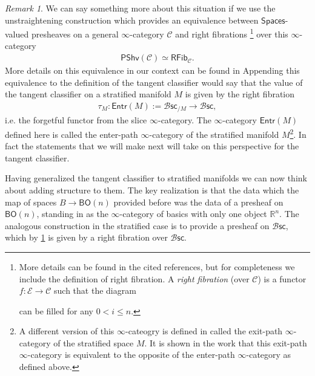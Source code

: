\documentclass[12pt,a4paper]{article}
\newcounter{counter} \numberwithin{counter}{section}
\theoremstyle{definition}
\theoremstyle{plain}
\theoremstyle{remark}
\newtheorem{remark}[counter]{Remark}
\newcommand{\catC}{\mathscr{C}}
\newcommand{\bsc}{\mathscr{B} \mathsf{sc}}
\begin{document}
\begin{remark}\label{rem:grothendieck_construction}
    We can say something more about this situation if we use the unstraightening construction \cite[sec.2.2]{lurie_htt} which provides an equivalence between $\mathsf{Spaces}$-valued presheaves on a general $\infty$-category $\catC$ and right fibrations \footnote{More details can be found in the cited references, but for completeness we include the definition of right fibration. A \emph{right fibration} (over $\catC$) is a functor $f:\mathscr{E} \rightarrow \catC$ such that the diagram
    \begin{center}
    \end{center}
    can be filled for any $0 < i \leq n$.} over this $\infty$-category
    \begin{align}
        \mathsf{PShv}(\catC) \simeq \mathsf{RFib}_{\catC}.
    \end{align}
    More details on this equivalence in our context can be found in \cite[sec.4.2]{aft_localstrut}
    Appending this equivalence to the definition of the tangent classifier would say that the value of the tangent classifier on a stratified manifold $M$ is given by the right fibration
    \begin{align}
        \tau_M: \mathsf{Entr}(M) := \bsc_{/M} \rightarrow \bsc,
    \end{align}
    i.e. the forgetful functor from the slice $\infty$-category. The $\infty$-category $\mathsf{Entr}(M)$ defined here is called the enter-path $\infty$-category of the stratified manifold $M$\footnote{A different version of this $\infty$-cateogry is defined in \cite[app.A.6]{lurie_ha} called the exit-path $\infty$-category of the stratified space $M$. It is shown in the work \cite{afr_homhyp} that this exit-path $\infty$-category is equivalent to the opposite of the enter-path $\infty$-category as defined above.}. In fact the statements that we will make next will take on this perspective for the tangent classifier.
\end{remark}

Having generalized the tangent classifier to stratified manifolds we can now think about adding structure to them. The key realization is that the data which the map of spaces $B \rightarrow \mathsf{BO}(n)$ provided before was the data of a presheaf on $\mathsf{BO}(n)$, standing in as the $\infty$-category of basics with only one object $\mathbb{R}^n$. The analogous construction in the stratified case is to provide a presheaf on $\bsc$, which by \cref{rem:grothendieck_construction} is given by a right fibration over $\bsc$. 
\end{document}
